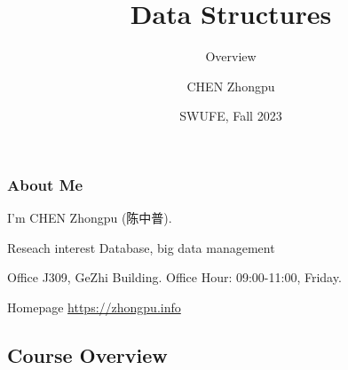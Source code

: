 \documentclass[aspectratio=169, 14pt]{beamer}
\title[Data Structures] %
{Data Structures}
\subtitle{Overview}
\author[CHEN Zhongpu] %
{CHEN Zhongpu}
\institute[] %
{
	School of Computing and Artificial Intelligence \\
	\href{mailto:zpchen@swufe.edu.cn}{zpchen@swufe.edu.cn}
}
\date[] %
{SWUFE, Fall 2023}
\begin{document}
\frame{\titlepage}

\begin{frame}
	\frametitle{About Me}
	I'm CHEN Zhongpu (陈中普).

	\begin{block}{ Reseach interest}
		Database, big data management
	\end{block}

	\begin{block}{ Office}
		J309, GeZhi Building. Office Hour: 09:00-11:00, Friday.
	\end{block}

	\begin{block}{ Homepage}
		\href{https://zhongpu.info}{https://zhongpu.info}
	\end{block}

\end{frame}

{
\begin{frame}
	\section{\textcolor{darkmidnightblue}{Course Overview}}
\end{frame}

}
\end{document}
